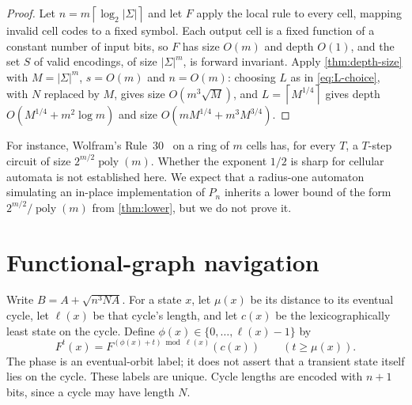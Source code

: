 \documentclass[11pt]{article}
\theoremstyle{definition}
\theoremstyle{remark}
\newcommand{\poly}{\operatorname{poly}}
\newcommand{\ceil}[1]{\left\lceil #1\right\rceil}
\numberwithin{equation}{section}
\begin{document}
\begin{proof}
Let $n=m\ceil{\log_2|\Sigma|}$ and let $F$ apply the local rule to every
cell, mapping invalid cell codes to a fixed symbol.  Each output cell is a
fixed function of a constant number of input bits, so $F$ has size $O(m)$
and depth $O(1)$, and the set $S$ of valid encodings, of size
$|\Sigma|^m$, is forward invariant.  Apply \cref{thm:depth-size} with
$M=|\Sigma|^m$, $s=O(m)$ and $n=O(m)$: choosing $L$ as in
\cref{eq:L-choice}, with $N$ replaced by $M$, gives size $O(m^3\sqrt M)$, and
$L=\ceil{M^{1/4}}$ gives depth $O(M^{1/4}+m^2\log m)$ and size
$O(mM^{1/4}+m^3M^{3/4})$.
\end{proof}

For instance, Wolfram's Rule~30~\cite{Wolfram86} on a ring of $m$ cells
has, for every $T$, a $T$-step circuit of size $2^{m/2}\poly(m)$.
Whether the exponent $1/2$ is sharp for cellular automata is not
established here.  We expect that a radius-one automaton simulating an
in-place implementation of $P_n$ inherits a lower bound of the form
$2^{m/2}/\poly(m)$ from \cref{thm:lower}, but we do not prove it.

\section{Functional-graph navigation}\label{sec:structure}

Write $B=A+\sqrt{n^3NA}$.  For a state $x$, let $\mu(x)$ be its distance
to its eventual cycle, let $\ell(x)$ be that cycle's length, and let $c(x)$
be the lexicographically least state on the cycle.  Define
$\phi(x)\in\{0,\ldots,\ell(x)-1\}$ by
\begin{equation}\label{eq:phase}
 F^t(x)=F^{(\phi(x)+t)\bmod\ell(x)}(c(x))\qquad(t\geq\mu(x)).
\end{equation}
The phase is an eventual-orbit label; it does not assert that a transient
state itself lies on the cycle.  These labels are unique.  Cycle lengths
are encoded with $n+1$ bits, since a cycle may have length $N$.
\end{document}
